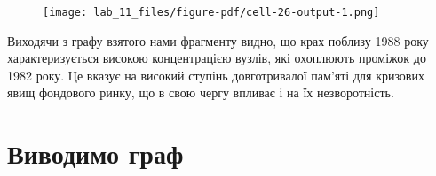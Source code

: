 \documentclass[
  letterpaper,
]{report}
\begin{document}
\begin{figure}[H]

{\centering \texttt{[image: lab\_11\_files/figure-pdf/cell-26-output-1.png]}

}

\end{figure}

Виходячи з графу взятого нами фрагменту видно, що крах поблизу 1988 року
характеризується високою концентрацією вузлів, які охоплюють проміжок до
1982 року. Це вказує на високий ступінь довготривалої пам'яті для
кризових явищ фондового ринку, що в свою чергу впливає і на їх
незворотність.

\hypertarget{ux432ux438ux432ux43eux434ux438ux43cux43e-ux433ux440ux430ux444}{%
\section{Виводимо
граф}\label{ux432ux438ux432ux43eux434ux438ux43cux43e-ux433ux440ux430ux444}}
\end{document}
